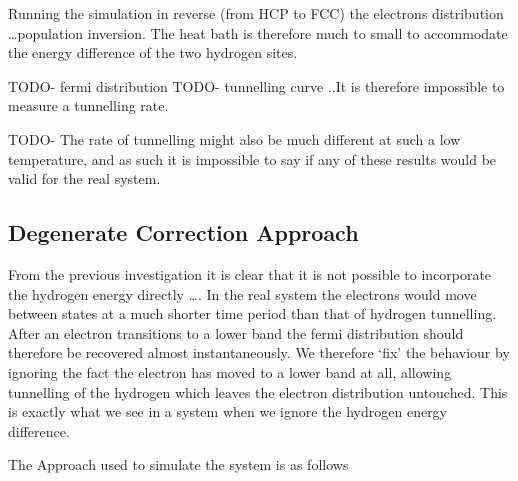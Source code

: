 Running the simulation
in reverse (from HCP to FCC) the electrons
distribution \ldots population inversion.
The heat bath is therefore much to small
to accommodate the energy difference of
the two hydrogen sites.

TODO- fermi distribution
TODO- tunnelling curve
..It is therefore impossible to measure a tunnelling
rate.

TODO- The rate of tunnelling might also
be much different at such a low temperature,
and as such it is impossible to say if
any of these results would be valid
for the real system.

\subsection{Degenerate Correction Approach}
From the previous investigation it is clear
that it is not possible to incorporate the
hydrogen energy directly \ldots. In the
real system the electrons would move
between states at a much shorter time
period than that of hydrogen tunnelling.
After an electron transitions to a lower
band the fermi distribution should therefore
be recovered almost instantaneously. We
therefore `fix' the behaviour by
ignoring the fact the electron
has moved to a lower band at all,
allowing tunnelling of the hydrogen
which leaves the electron distribution
untouched. This is exactly what
we see in a system when we ignore
the hydrogen energy difference.


The Approach used to simulate the system is as follows